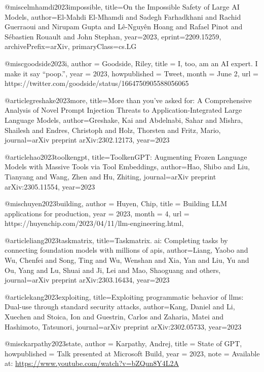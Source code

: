 @misc{elmhamdi2023impossible,
      title={On the Impossible Safety of Large AI Models},
      author={El-Mahdi El-Mhamdi and Sadegh Farhadkhani and Rachid Guerraoui and Nirupam Gupta and Lê-Nguyên Hoang and Rafael Pinot and Sébastien Rouault and John Stephan},
      year={2023},
      eprint={2209.15259},
      archivePrefix={arXiv},
      primaryClass={cs.LG}
}

@misc{goodside2023i,
  author = {Goodside, Riley},
  title = {I, too, am an AI expert. I make it say “poop.”},
  year = {2023},
  howpublished = {Tweet},
  month = {June 2},
  url = {https://twitter.com/goodside/status/1664750905588056065}
}

@article{greshake2023more,
  title={More than you've asked for: A Comprehensive Analysis of Novel Prompt Injection Threats to Application-Integrated Large Language Models},
  author={Greshake, Kai and Abdelnabi, Sahar and Mishra, Shailesh and Endres, Christoph and Holz, Thorsten and Fritz, Mario},
  journal={arXiv preprint arXiv:2302.12173},
  year={2023}
}

@article{hao2023toolkengpt,
  title={ToolkenGPT: Augmenting Frozen Language Models with Massive Tools via Tool Embeddings},
  author={Hao, Shibo and Liu, Tianyang and Wang, Zhen and Hu, Zhiting},
  journal={arXiv preprint arXiv:2305.11554},
  year={2023}
}

@misc{huyen2023building,
  author = {Huyen, Chip},
  title = {Building LLM applications for production},
  year = {2023},
  month = {4},
  url = {https://huyenchip.com/2023/04/11/llm-engineering.html},
}

@article{liang2023taskmatrix,
  title={Taskmatrix. ai: Completing tasks by connecting foundation models with millions of apis},
  author={Liang, Yaobo and Wu, Chenfei and Song, Ting and Wu, Wenshan and Xia, Yan and Liu, Yu and Ou, Yang and Lu, Shuai and Ji, Lei and Mao, Shaoguang and others},
  journal={arXiv preprint arXiv:2303.16434},
  year={2023}
}

@article{kang2023exploiting,
  title={Exploiting programmatic behavior of llms: Dual-use through standard security attacks},
  author={Kang, Daniel and Li, Xuechen and Stoica, Ion and Guestrin, Carlos and Zaharia, Matei and Hashimoto, Tatsunori},
  journal={arXiv preprint arXiv:2302.05733},
  year={2023}
}

@misc{karpathy2023state,
  author = {Karpathy, Andrej},
  title = {State of GPT},
  howpublished = {Talk presented at Microsoft Build},
  year = {2023},
  note = {Available at: \url{https://www.youtube.com/watch?v=bZQun8Y4L2A}}
}

